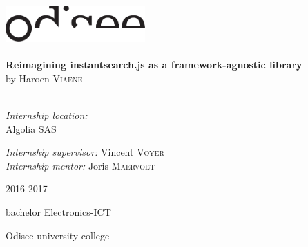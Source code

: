\begin{titlepage}
\begin{center}
\includegraphics[width=0.4\textwidth]{./assets/logo.pdf}~\\[1cm]

\HRule \\[0.4cm]
{ \LARGE \bfseries Reimagining instantsearch.js as a framework-agnostic library}\\[0.4cm]
{by Haroen \textsc{Viaene}}\\[0.2cm]

\HRule \\[1.5cm]

\begin{minipage}{0.49\textwidth}
\begin{flushleft} \large
\emph{Internship location:}\\
Algolia SAS\\

\end{flushleft}
\end{minipage}
\begin{minipage}{0.49\textwidth}
\begin{flushright} \large
\emph{Internship supervisor:}
Vincent \textsc{Voyer}\\
\emph{Internship mentor:}
Joris \textsc{Maervoet}\\
\end{flushright}
\end{minipage}

\vfill

{\large 2016-2017}

{\large{bachelor Electronics-ICT}}

{\large Odisee university college}

\end{center}
\end{titlepage}

